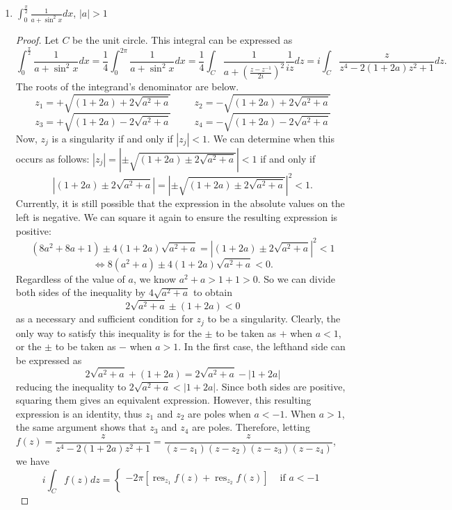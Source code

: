 \documentclass[10pt]{article}
\newcommand{\Int}{\displaystyle\int}
\DeclareMathOperator*{\res}{res}
\begin{document}
\begin{enumerate}
\pagebreak
\item $\Int_0^{\frac{\pi}{2}} \frac{1}{a + \sin^2 x} dx$, \hspace{.5cm} $|a| > 1$

\begin{proof}
Let $C$ be the unit circle.  This integral can be expressed as
$$
\Int_0^{\frac{\pi}{2}} \frac{1}{a + \sin^2 x} dx = \frac{1}{4}\Int_0^{2\pi} \frac{1}{a + \sin^2 x} dx = \frac{1}{4} \Int_{C} \frac{1}{a + (\frac{z - z^{-1}}{2i})^2} \frac{1}{iz} dz = i \int_{C} \frac{z}{z^4 - 2(1+2a)z^2 + 1} dz.
$$
The roots of the integrand's denominator are below.
$$
z_1 = + \sqrt{(1+2a) +2 \sqrt{a^2 + a}} \hspace{1cm}
z_2 = - \sqrt{(1+2a) +2 \sqrt{a^2 + a}}
$$
$$
z_3 = + \sqrt{(1+2a) -2 \sqrt{a^2 + a}} \hspace{1cm}
z_4 = - \sqrt{(1+2a) -2 \sqrt{a^2 + a}}
$$
Now, $z_j$ is a singularity if and only if $|z_j| < 1$.  We can determine when this occurs as follows:
$
|z_j| = \left| \pm \sqrt{(1+2a) \pm 2 \sqrt{a^2 + a}} \right| < 1
$
if and only if
$$
\left| (1+2a) \pm 2 \sqrt{a^2 + a}\right| = \left| \pm \sqrt{(1+2a) \pm 2 \sqrt{a^2 + a}} \right|^2 < 1.
$$
Currently, it is still possible that the expression in the absolute values on the left is negative.  We can square it again to ensure the resulting expression is positive:
$$
(8a^2 + 8a + 1) \pm 4(1+2a)\sqrt{a^2 + a} = \left| (1+2a) \pm 2 \sqrt{a^2 + a}\right|^2 < 1
$$
$$
\iff 8(a^2 + a) \pm 4(1+2a)\sqrt{a^2 + a} < 0.
$$
Regardless of the value of $a$, we know $a^2 + a > 1 + 1 > 0$.  So we can divide both sides of the inequality by $4\sqrt{a^2 + a}$ to obtain
$$
2\sqrt{a^2 + a} \pm (1+2a) < 0
$$
as a necessary and sufficient condition for $z_j$ to be a singularity.  Clearly, the only way to satisfy this inequality is for the $\pm$ to be taken as $+$ when $a < 1$, or the $\pm$ to be taken as $-$ when $a > 1$.  In the first case, the lefthand side can be expressed as
$$
2\sqrt{a^2 + a} + (1+2a) = 2\sqrt{a^2 + a} - |1+2a|
$$
reducing the inequality to $2\sqrt{a^2 + a} < |1+2a|$.  Since both sides are positive, squaring them gives an equivalent expression.  However, this resulting expression is an identity, thus $z_1$ and $z_2$ are poles when $a < -1$.  When $a > 1$, the same argument shows that $z_3$ and $z_4$ are poles.  Therefore, letting $f(z) = \dfrac{z}{z^4 - 2(1+2a)z^2 + 1} = \dfrac{z}{(z - z_1) (z - z_2) (z - z_3) (z - z_4)}$, we have
$$
i \int_{C} f(z) dz =
\begin{cases}
-2\pi [\res\nolimits_{z_1} f(z) + \res\nolimits_{z_2} f(z) ] & \text{ if } a < -1 \\

\end{cases}$$
\end{proof}
\end{enumerate}
\end{document}
